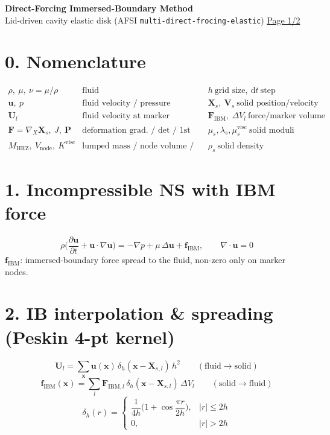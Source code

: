 \documentclass[10pt]{article}
\newcommand{\dd}{\mathrm{d}}
\begin{document}
\begin{center}
{\large\bf Direct-Forcing Immersed-Boundary Method}\\
Lid-driven cavity elastic disk \quad (AFSI \texttt{multi-direct-frocing-elastic}) \quad \underline{Page 1/2}
\end{center}

\section*{0. Nomenclature}
\[
\begin{array}{lll}
\rho,\ \mu,\ \nu=\mu/\rho & \text{fluid density/viscosity/diffusivity} & h\ \text{grid size},\ \dd t\ \text{step}\\[2pt]
\bm u,\ p & \text{fluid velocity / pressure} & \bm X_s,\ \bm V_s\ \text{solid position/velocity}\\[2pt]
\bm U_l & \text{fluid velocity at marker} & \bm F_{\mathrm{IBM}},\ \Delta V_l\ \text{force/marker volume}\\[2pt]
\bm F=\nabla_X\bm X_s,\ J,\ \bm P & \text{deformation grad. / det / 1st P-K} & \mu_s,\lambda_s,\mu_s^{\mathrm{visc}}\ \text{solid moduli}\\[2pt]
M_{\mathrm{HRZ}},\ V_{\mathrm{node}},\ K^{\mathrm{visc}} & \text{lumped mass / node volume / visc. stiffness} & \rho_s\ \text{solid density}
\end{array}
\]

\section*{1. Incompressible NS with IBM force}
\[
\rho\Big(\frac{\partial \bm u}{\partial t}+\bm u\!\cdot\!\nabla \bm u\Big)
= -\nabla p + \mu\,\Delta \bm u + \bm f_{\mathrm{IBM}},
\qquad \nabla\!\cdot\!\bm u = 0
\]
\(\bm f_{\mathrm{IBM}}\): immersed-boundary force spread to the fluid, non-zero only on marker nodes.

\section*{2. IB interpolation \& spreading (Peskin 4-pt kernel)}
\[
\bm U_l = \sum_{\bm x}\bm u(\bm x)\,\delta_h(\bm x-\bm X_{s,l})\,h^2
\qquad(\text{fluid}\to\text{solid})
\]
\[
\bm f_{\mathrm{IBM}}(\bm x)=\sum_l \bm F_{\mathrm{IBM},l}\,\delta_h(\bm x-\bm X_{s,l})\,\Delta V_l
\qquad(\text{solid}\to\text{fluid})
\]
\[
\delta_h(r)=
\begin{cases}
\dfrac{1}{4h}\Big(1+\cos\dfrac{\pi r}{2h}\Big), & |r|\le 2h\\[4pt]
0, & |r|>2h
\end{cases}
\]
\end{document}
